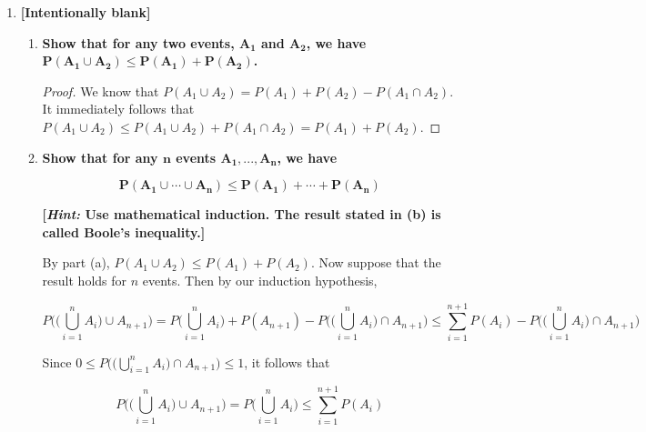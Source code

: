 \documentclass[10pt, oneside]{article}   	%
\theoremstyle{definition}
\begin{document}
\begin{enumerate}[label=1.\arabic*]
\item  \begin{tcolorbox}[
  colback=Cerulean!5!white,
  colframe=Cerulean!75!black]
\textbf{[Intentionally blank]}
\end{tcolorbox}

	\begin{enumerate}
	\item  \begin{tcolorbox}[
	  colback=Cerulean!5!white,
	  colframe=Cerulean!75!black]
	\textbf{Show that for any two events, $\bm{A_1}$ and $\bm{A_2}$, we have $\bm{P(A_1 \cup A_2) \leq P(A_1) + P(A_2)}$.}
	\end{tcolorbox}
	
	\begin{proof} We know that $P(A_1 \cup A_2) = P(A_1) + P(A_2) - P(A_1 \cap A_2)$. It immediately follows that $P(A_1 \cup A_2) \leq P(A_1 \cup A_2) + P(A_1 \cap A_2) = P(A_1) + P(A_2)$. 
	\end{proof}
	
	\item  \begin{tcolorbox}[
	  colback=Cerulean!5!white,
	  colframe=Cerulean!75!black]
	\textbf{Show that for any $\bm{n}$ events $\bm{A_1, ..., A_n}$, we have}
	
	\[ \bm{P(A_1 \cup \cdots \cup A_n) \leq P(A_1) + \cdots + P(A_n)} \]
	
	\textbf{[\textit{Hint:} Use mathematical induction. The result stated in (b) is called Boole's inequality.]}
	\end{tcolorbox}
	
	By part (a), $P(A_1 \cup A_2) \leq P(A_1) + P(A_2)$. Now suppose that the result holds for $n$ events. Then by our induction hypothesis,
	
	\[
	P \bigg( \bigg( \bigcup^n_{i=1} A_i \bigg) \cup A_{n+1} \bigg) = P \bigg( \bigcup^n_{i=1} A_i \bigg) + P (A_{n+1}) - P \bigg( \bigg( \bigcup^n_{i=1} A_i \bigg) \cap A_{n+1} \bigg) \leq \sum^{n+1}_{i=1} P(A_i) - P \bigg( \bigg( \bigcup^n_{i=1} A_i \bigg) \cap A_{n+1} \bigg)
	\]
	
	Since $0 \leq P \big( \big( \bigcup^n_{i=1} A_i \big) \cap A_{n+1} \big) \leq 1$, it follows that
	
	\[ P \bigg( \bigg( \bigcup^n_{i=1} A_i \bigg) \cup A_{n+1} \bigg) = \boxed{P \bigg( \bigcup^n_{i=1} A_i \bigg) \leq \sum^{n+1}_{i=1} P(A_i)} \]
	\end{enumerate}


\end{enumerate}
\end{document}
